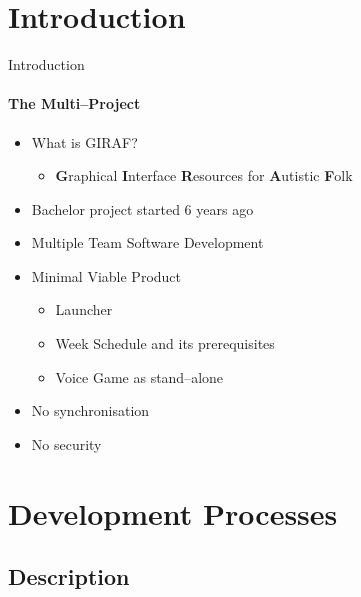 \section{Introduction}
    \begin{frame}[t]{Introduction}\framesubtitle{The Multi--Project}
        \begin{itemize}
	        \item What is GIRAF?
	        	\begin{itemize}
	        		\item \textbf{G}raphical \textbf{I}nterface \textbf{R}esources for \textbf{A}utistic \textbf{F}olk
	        	\end{itemize}
        	\item Bachelor project started 6 years ago
        	\item Multiple Team Software Development
        	\item Minimal Viable Product
        		\begin{itemize}
        			\item Launcher 
        			\item Week Schedule and its prerequisites
        			\item Voice Game as stand--alone
        		\end{itemize}
    			\item No synchronisation
    			\item No security
    		\end{itemize}
    \end{frame}

\section{Development Processes}
	\subsection{Description}
